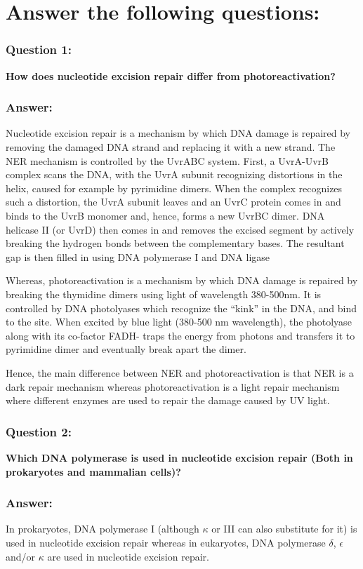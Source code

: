 \documentclass{report}
\begin{document}
\section*{Answer the following questions:}

\subsubsection*{Question 1:}
\textbf{How does nucleotide excision repair differ from photoreactivation?}

\subsubsection*{Answer:}
Nucleotide excision repair is a mechanism by which DNA damage is repaired by removing the damaged DNA strand and replacing it with a new strand.
The NER mechanism is controlled by the UvrABC system.
First, a UvrA-UvrB complex scans the DNA, with the UvrA subunit recognizing distortions in the helix,
caused for example by pyrimidine dimers. When the complex recognizes such a distortion, 
the UvrA subunit leaves and an UvrC protein comes in and binds to the UvrB monomer and, hence, forms a new UvrBC dimer. 
DNA helicase II (or UvrD) then comes in and removes the excised segment by actively breaking 
the hydrogen bonds between the complementary bases. The resultant gap is then filled in using DNA polymerase I and DNA ligase


Whereas, photoreactivation is a mechanism by which DNA damage is repaired by breaking the thymidine dimers using light of wavelength 380-500nm.
It is controlled by DNA photolyases which recognize the “kink” in the DNA, and bind to the site. When excited by blue light (380-500 nm wavelength), the photolyase along with its co-factor FADH- 
traps the energy from photons and transfers it to pyrimidine dimer and eventually break apart the dimer.

Hence, the main difference between NER and photoreactivation is that NER is a dark repair mechanism whereas photoreactivation is a light repair mechanism
where different enzymes are used to repair the damage caused by UV light.







\subsubsection*{Question 2:}
\textbf{Which DNA polymerase is used in nucleotide excision repair (Both in prokaryotes and mammalian cells)?}

\subsubsection*{Answer:}
In prokaryotes, DNA polymerase I (although $\kappa$ or III can also substitute for it) is used in nucleotide excision repair whereas
in eukaryotes, DNA polymerase $\delta$, $\epsilon$ and/or $\kappa$ are used in nucleotide excision repair.
\end{document}
